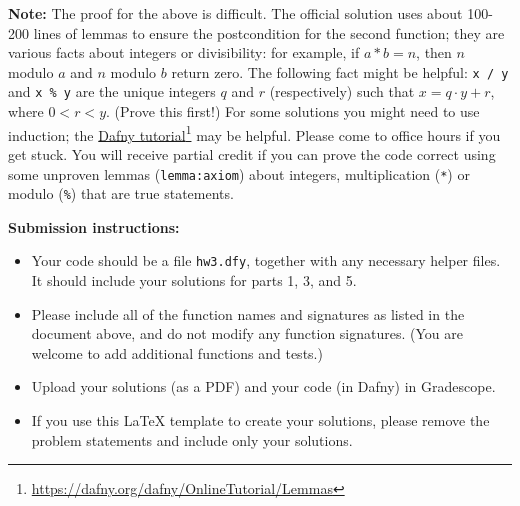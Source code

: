 \documentclass{article}
\newcommand{\visiblehref}[2]{\href{#1}{#2}\footnote{\url{#1}}}
\begin{document}
\begin{enumerate}
\textbf{Note:}
The proof for the above is difficult.
The official solution uses about 100-200 lines of lemmas
to ensure the postcondition for the second function;
they are various facts about integers or divisibility:
for example, if $a * b = n$, then $n$ modulo $a$ and $n$ modulo $b$ return zero.
The following fact might be helpful: \texttt{x / y} and \texttt{x \% y} are the unique integers $q$ and $r$ (respectively) such that $x = q \cdot y + r$, where $0 < r < y$. (Prove this first!)
For some solutions you might need to use induction; the \visiblehref{https://dafny.org/dafny/OnlineTutorial/Lemmas}{Dafny tutorial} may be helpful.
Please come to office hours if you get stuck.
You will receive partial credit if you can prove the code correct using some unproven lemmas (\texttt{lemma{:axiom}}) about integers, multiplication (\texttt{*}) or modulo (\texttt{\%}) that are true statements.

\end{enumerate}

\noindent
\textbf{Submission instructions:}
\begin{itemize}
\item Your code should be a file \texttt{hw3.dfy}, together with any necessary helper files.
It should include your solutions for parts 1, 3, and 5.
\item Please include all of the function names and signatures as listed in the document above,
and do not modify any function signatures. (You are welcome to add additional functions and tests.)
\item Upload your solutions (as a PDF) and your code (in Dafny) in Gradescope.
\item If you use this LaTeX template to create your solutions, please remove the problem statements and include only your solutions.
\end{itemize}
\end{document}
